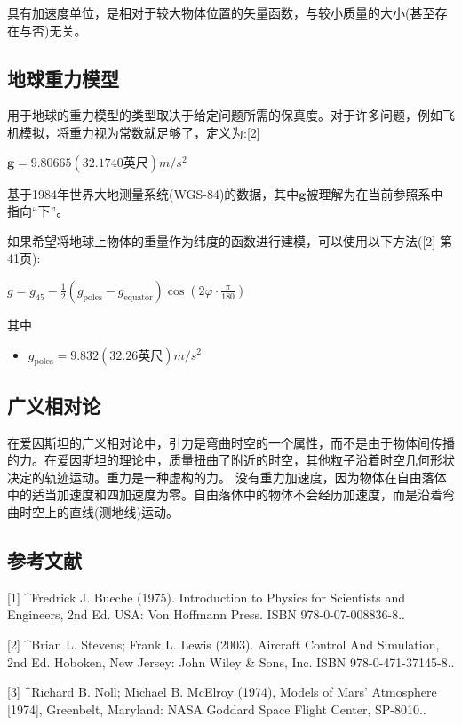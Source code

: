 具有加速度单位，是相对于较大物体位置的矢量函数，与较小质量的大小(甚至存在与否)无关。

\subsection{地球重力模型}

用于地球的重力模型的类型取决于给定问题所需的保真度。对于许多问题，例如飞机模拟，将重力视为常数就足够了，定义为:[2]

$\mathbf{g} =9.80665(32.1740\text{英尺}) m/s^2$

基于1984年世界大地测量系统(WGS-84)的数据，其中$\mathbf{g}$被理解为在当前参照系中指向“下”。

如果希望将地球上物体的重量作为纬度的函数进行建模，可以使用以下方法([2] 第41页):

$g = g_{45} - \frac{1}{2} \left( g_{\text{poles}} - g_{\text{equator}} \right) \cos \left( 2 \varphi \cdot \frac{\pi}{180} \right)$

其中

\begin{itemize}
\item $g_\text{poles}=9.832 (32.26\text{英尺})m/s^2$
\end{itemize}



\subsection{广义相对论}

在爱因斯坦的广义相对论中，引力是弯曲时空的一个属性，而不是由于物体间传播的力。在爱因斯坦的理论中，质量扭曲了附近的时空，其他粒子沿着时空几何形状决定的轨迹运动。重力是一种虚构的力。 没有重力加速度，因为物体在自由落体中的适当加速度和四加速度为零。自由落体中的物体不会经历加速度，而是沿着弯曲时空上的直线(测地线)运动。

\subsection{参考文献}

[1]
^Fredrick J. Bueche (1975). Introduction to Physics for Scientists and Engineers, 2nd Ed. USA: Von Hoffmann Press. ISBN 978-0-07-008836-8..

[2]
^Brian L. Stevens; Frank L. Lewis (2003). Aircraft Control And Simulation, 2nd Ed. Hoboken, New Jersey: John Wiley & Sons, Inc. ISBN 978-0-471-37145-8..

[3]
^Richard B. Noll; Michael B. McElroy (1974), Models of Mars' Atmosphere [1974], Greenbelt, Maryland: NASA Goddard Space Flight Center, SP-8010..